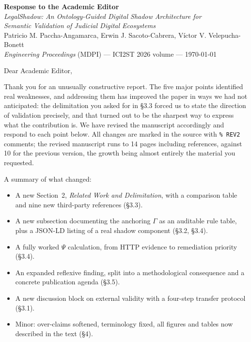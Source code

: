 \documentclass[11pt,a4paper]{article}
\begin{document}
\begin{center}
{\Large\bfseries Response to the Academic Editor}\\[4pt]
{\large \emph{LegalShadow: An Ontology-Guided Digital Shadow Architecture for\\ Semantic Validation of Judicial Digital Ecosystems}}\\[6pt]
Patricio M. Paccha-Angamarca, Erwin J. Sacoto-Cabrera, V\'ictor V. Velepucha-Bonett\\[4pt]
\emph{Engineering Proceedings} (MDPI) --- ICI2ST 2026 volume --- \today
\end{center}

\vspace{6pt}

\noindent Dear Academic Editor,

\vspace{4pt}

\noindent Thank you for an unusually constructive report. The five major points identified real weaknesses, and addressing them has improved the paper in ways we had not anticipated: the delimitation you asked for in \S3.3 forced us to state the direction of validation precisely, and that turned out to be the sharpest way to express what the contribution is. We have revised the manuscript accordingly and respond to each point below. All changes are marked in the source with \texttt{\% REV2} comments; the revised manuscript runs to 14 pages including references, against 10 for the previous version, the growth being almost entirely the material you requested.

\vspace{4pt}

\noindent A summary of what changed:

\begin{itemize}
  \item A new Section~2, \emph{Related Work and Delimitation}, with a comparison table and nine new third-party references (\S3.3).
  \item A new subsection documenting the anchoring $\Gamma$ as an auditable rule table, plus a JSON-LD listing of a real shadow component (\S3.2, \S3.4).
  \item A fully worked $\Psi$ calculation, from HTTP evidence to remediation priority (\S3.4).
  \item An expanded reflexive finding, split into a methodological consequence and a concrete publication agenda (\S3.5).
  \item A new discussion block on external validity with a four-step transfer protocol (\S3.1).
  \item Minor: over-claims softened, terminology fixed, all figures and tables now described in the text (\S4).
\end{itemize}
\end{document}
